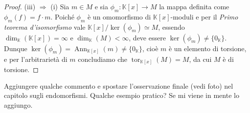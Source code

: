 \documentclass{article}
\theoremstyle{definition}
\newcommand{\tor}{\operatorname{tor}}
\newcommand{\Ann}{\operatorname{Ann}}
\begin{document}
\begin{proof}
\vspace{0.5mm}

\noindent (iii) $\Rightarrow$ (i) Sia $m\in M$ e sia $\phi_m\colon \mathbb{K}[x]\to M$ la mappa definita come $\phi_m(f)=f\cdot m$. Poiché $\phi_m$ è un omomorfismo di $\mathbb{K}[x]$-moduli e per il \emph{Primo teorema d'isomorfismo} vale $\mathbb{K}[x]/\ker(\phi_m)\simeq M$, essendo $\operatorname{dim}_{\mathbb{K}}(\mathbb{K}[x])=\infty$ e $\operatorname{dim}_{\mathbb{K}}(M)<\infty$, deve essere $\ker(\phi_m)\neq \{0_{\mathbb{K}}\}$. Dunque $\ker(\phi_m)=\Ann_{\mathbb{K}[x]}(m)\neq \{0_{\mathbb{K}}\}$, cioè $m$ è un elemento di torsione, e per l'arbitrarietà di $m$ concludiamo che $\tor_{\mathbb{K}[x]}(M)=M$, da cui $M$ è di torsione.
\end{proof}

\noindent Aggiungere qualche commento e spostare l'osservazione finale (vedi foto) nel capitolo sugli endomorfismi. Qualche esempio pratico? Se mi viene in mente lo aggiungo.
\end{document}
